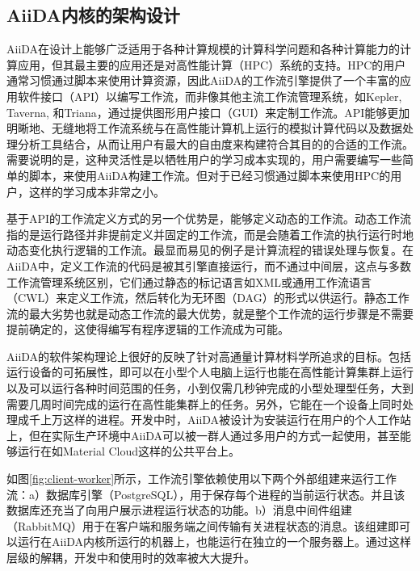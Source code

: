 \subsection{AiiDA内核的架构设计}

AiiDA在设计上能够广泛适用于各种计算规模的计算科学问题和各种计算能力的计算应用，但其最主要的应用还是对高性能计算（HPC）系统的支持。HPC的用户通常习惯通过脚本来使用计算资源，因此AiiDA的工作流引擎提供了一个丰富的应用软件接口（API）以编写工作流，而非像其他主流工作流管理系统，如Kepler\cite{altintas2004kepler}, Taverna\cite{oinn2004taverna},  和Triana\cite{taylor2003triana}，通过提供图形用户接口（GUI）来定制工作流。API能够更加明晰地、无缝地将工作流系统与在高性能计算机上运行的模拟计算代码以及数据处理分析工具结合，从而让用户有最大的自由度来构建符合其目的的合适的工作流。需要说明的是，这种灵活性是以牺牲用户的学习成本实现的，用户需要编写一些简单的脚本，来使用AiiDA构建工作流。但对于已经习惯通过脚本来使用HPC的用户，这样的学习成本非常之小。

基于API的工作流定义方式的另一个优势是，能够定义动态的工作流。动态工作流指的是运行路径并非提前定义并固定的工作流，而是会随着工作流的执行运行时地动态变化执行逻辑的工作流。最显而易见的例子是计算流程的错误处理与恢复。在AiiDA中，定义工作流的代码是被其引擎直接运行，而不通过中间层，这点与多数工作流管理系统区别，它们通过静态的标记语言如XML或通用工作流语言（CWL）\cite{amstutz2016common}来定义工作流，然后转化为无环图（DAG）的形式以供运行。静态工作流的最大劣势也就是动态工作流的最大优势，就是整个工作流的运行步骤是不需要提前确定的，这使得编写有程序逻辑的工作流成为可能。

AiiDA的软件架构理论上很好的反映了针对高通量计算材料学所追求的目标。包括运行设备的可拓展性，即可以在小型个人电脑上运行也能在高性能计算集群上运行以及可以运行各种时间范围的任务，小到仅需几秒钟完成的小型处理型任务，大到需要几周时间完成的运行在高性能集群上的任务。另外，它能在一个设备上同时处理成千上万这样的进程。开发中时，AiiDA被设计为安装运行在用户的个人工作站上，但在实际生产环境中AiiDA可以被一群人通过多用户的方式一起使用，甚至能够运行在如Material Cloud\cite{talirz2020materials}这样的公共平台上。

如图\ref{fig:client-worker}所示，工作流引擎依赖使用以下两个外部组建来运行工作流：a）数据库引擎（PostgreSQL\cite{postgresql}），用于保存每个进程的当前运行状态。并且该数据库还充当了向用户展示进程运行状态的功能。b）消息中间件组建（RabbitMQ\cite{rabbitmq}）用于在客户端和服务端之间传输有关进程状态的消息。该组建即可以运行在AiiDA内核所运行的机器上，也能运行在独立的一个服务器上。通过这样层级的解耦，开发中和使用时的效率被大大提升。

